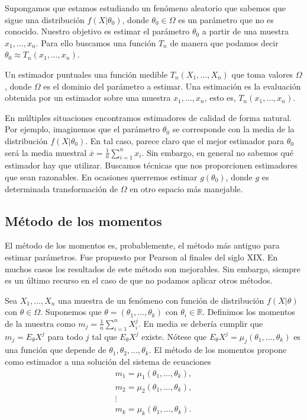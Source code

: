 \documentclass{article}
\begin{document}
Supongamos que estamos estudiando un fenómeno aleatorio que sabemos que sigue una distribución $f(X | \theta_0)$, donde $\theta_0 \in \Omega$ es un parámetro que no es conocido. Nuestro objetivo es estimar el parámetro $\theta_0$ a partir de una muestra $x_1, \ldots, x_n$. Para ello buscamos una función $T_n$ de manera que podamos decir $\theta_0 \approx T_n(x_1, \ldots, x_n)$.

\begin{definition}
    Un estimador puntuales una función medible $T_n(X_1, \ldots, X_n)$ que toma valores $\Omega$, donde $\Omega$ es el dominio del parámetro a estimar. Una estimación es la evaluación obtenida por un estimador sobre una muestra $x_1, \ldots, x_n$, esto es, $T_n(x_1, \ldots, x_n)$.
\end{definition}

En múltiples situaciones encontramos estimadores de calidad de forma natural. Por ejemplo, imaginemos que el parámetro $\theta_0$ se corresponde con la media de la distribución $f(X | \theta_0)$. En tal caso, parece claro que el mejor estimador para $\theta_0$ será la media muestral $\overline{x} = \frac{1}{n}\sum_{i = 1}^n x_i$. Sin embargo, en general no sabemos qué estimador hay que utilizar. Buscamos técnicas que nos proporcionen estimadores que sean razonables. En ocasiones querremos estimar $g(\theta_0)$, donde $g$ es determinada transformación de $\Omega$ en otro espacio más manejable.

\subsection{Método de los momentos}

El método de los momentos es, probablemente, el método más antiguo para estimar parámetros. Fue propuesto por Pearson al finales del siglo XIX. En muchos casos los resultados de este método son mejorables. Sin embargo, siempre es un último recurso en el caso de que no podamos aplicar otros métodos.

Sea $X_1, \ldots, X_n$ una muestra de un fenómeno con función de distribución $f(X |\theta)$ con $\theta \in \Omega$. Suponemos que $\theta = (\theta_1, \ldots, \theta_k)$ con $\theta_i \in \mathbb{R}$. Definimos los momentos de la muestra como $m_j = \frac{1}{n} \sum_{i = 1}^n X_i^j$. En media se debería cumplir que $m_j = E_\theta X^j$ para todo $j$ tal que $E_\theta X^j$ existe. Nótese que $E_\theta X^j = \mu_j(\theta_1, \ldots, \theta_k)$ es una función que depende de $\theta_1, \theta_2, \ldots, \theta_k$. El método de los momentos propone como estimador a una solución del sistema de ecuaciones
\begin{equation} \label{eq:sistema-momentos}
    \begin{matrix}
        m_1 = \mu_1(\theta_1, \ldots, \theta_k), \\
        m_2 = \mu_2(\theta_1, \ldots, \theta_k), \\
        \vdots \\
        m_k = \mu_k(\theta_1, \ldots, \theta_k). \\
    \end{matrix}
\end{equation}
\end{document}
